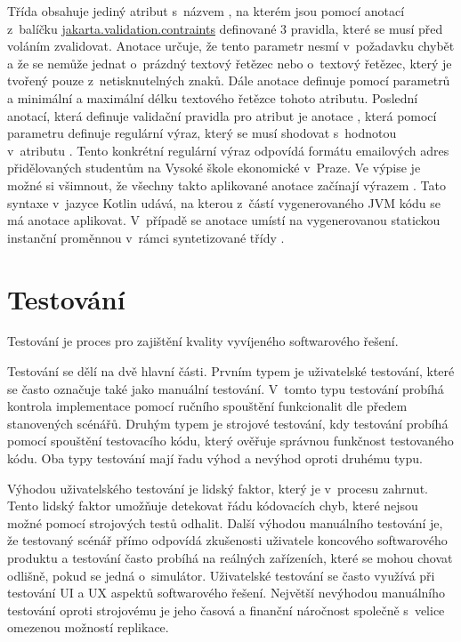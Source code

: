 Třída  obsahuje jediný atribut s~názvem , na kterém jsou pomocí anotací z~balíčku \url{jakarta.validation.contraints} definované 3 pravidla, které se musí před voláním zvalidovat. Anotace  určuje, že tento parametr nesmí v~požadavku chybět a že se nemůže jednat o~prázdný textový řetězec nebo o~textový řetězec, který je tvořený pouze z~netisknutelných znaků. Dále anotace  definuje pomocí parametrů  a  minimální a maximální délku textového řetězce tohoto atributu. Poslední anotací, která definuje validační pravidla pro atribut  je anotace , která pomocí parametru  definuje regulární výraz, který se musí shodovat s~hodnotou v~atributu \cite[kap 2.3]{walls_spring_2019}. Tento konkrétní regulární výraz odpovídá formátu emailových adres přidělovaných studentům na Vysoké škole ekonomické v~Praze. Ve výpise je možné si všimnout, že všechny takto aplikované anotace začínají výrazem . Tato syntaxe v~jazyce Kotlin udává, na kterou z~částí vygenerovaného JVM kódu se má anotace aplikovat. V~případě  se anotace umístí na vygenerovanou statickou instanční proměnnou v~rámci syntetizované třídy \cite{ebel_mastering_2019}.

\section{Testování}\label{sec:testovani}

Testování je proces pro zajištění kvality vyvíjeného softwarového řešení. 

Testování se dělí na dvě hlavní části. Prvním typem je uživatelské testování, které se často označuje také jako manuální testování. V~tomto typu testování probíhá kontrola implementace pomocí ručního spouštění funkcionalit dle předem stanovených scénářů. Druhým typem je strojové testování, kdy testování probíhá pomocí spouštění testovacího kódu, který ověřuje správnou funkčnost testovaného kódu. Oba typy testování mají řadu výhod a nevýhod oproti druhému typu. 

Výhodou uživatelského testování je lidský faktor, který je v~procesu zahrnut. Tento lidský faktor umožňuje detekovat řádu kódovacích chyb, které nejsou možné pomocí strojových testů odhalit. Další výhodou manuálního testování je, že testovaný scénář přímo odpovídá zkušenosti uživatele koncového softwarového produktu a testování často probíhá na reálných zařízeních, které se mohou chovat odlišně, pokud se jedná o~simulátor. Uživatelské testování se často využívá při testování UI a UX aspektů softwarového řešení. Největší nevýhodou manuálního testování oproti strojovému je jeho časová a finanční náročnost společně s~velice omezenou možností replikace. 

